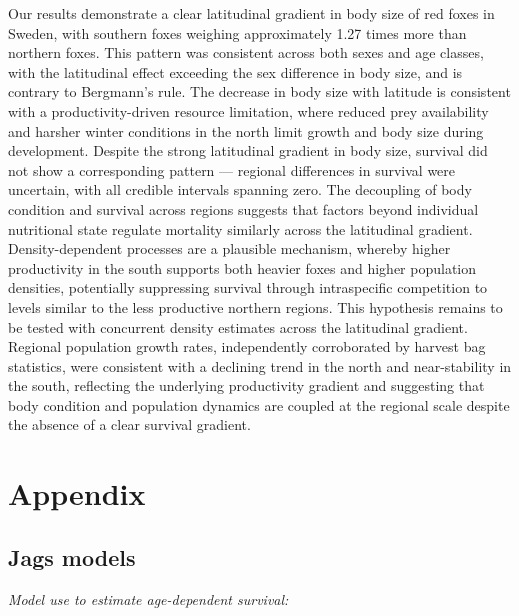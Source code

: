 \documentclass[12pt,a4paper,final,abstract=true,headings=small]{scrartcl}
\begin{document}
Our results demonstrate a clear latitudinal gradient in body size of red
foxes in Sweden, with southern foxes weighing approximately 1.27 times more
than northern foxes. This pattern was consistent across both sexes and age
classes, with the latitudinal effect exceeding the sex difference in body
size, and is contrary to Bergmann's rule. The decrease in body size with
latitude is consistent with a productivity-driven resource limitation, where
reduced prey availability and harsher winter conditions in the north limit
growth and body size during development. Despite the strong latitudinal
gradient in body size, survival did not show a corresponding pattern ---
regional differences in survival were uncertain, with all credible intervals
spanning zero. The decoupling of body condition and survival across regions
suggests that factors beyond individual nutritional state regulate mortality
similarly across the latitudinal gradient. Density-dependent processes are
a plausible mechanism, whereby higher productivity in the south supports
both heavier foxes and higher population densities, potentially suppressing
survival through intraspecific competition to levels similar to the less
productive northern regions. This hypothesis remains to be tested with
concurrent density estimates across the latitudinal gradient. Regional
population growth rates, independently corroborated by harvest bag
statistics, were consistent with a declining trend in the north and
near-stability in the south, reflecting the underlying productivity gradient
and suggesting that body condition and population dynamics are coupled at
the regional scale despite the absence of a clear survival gradient.


\newpage
\singlespacing
\printbibliography

\newpage

\section*{Appendix}

\subsection*{Jags models}

\emph{Model use to estimate age-dependent survival:} \label{app:brood}
\end{document}
